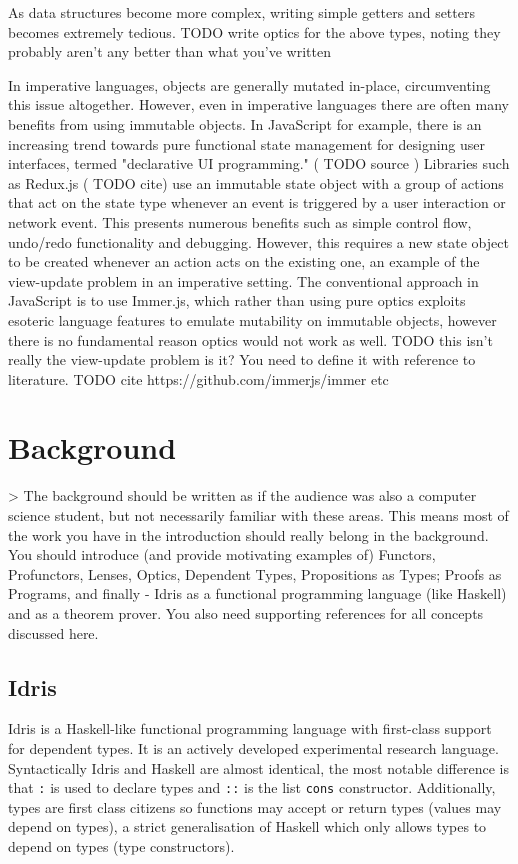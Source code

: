 \documentclass[]{report}
\begin{document}
As data structures become more complex, writing simple getters and setters becomes extremely tedious. TODO write optics for the above types, noting they probably aren't any better than what you've written

In imperative languages, objects are generally mutated in-place, circumventing this issue altogether. However, even in imperative languages there are often many benefits from using immutable objects. In JavaScript for example, there is an increasing trend towards pure functional state management for designing user interfaces, termed "declarative UI programming." ( TODO source ) Libraries such as Redux.js ( TODO cite) use an immutable state object with a group of actions that act on the state type whenever an event is triggered by a user interaction or network event. This presents numerous benefits such as simple control flow, undo/redo functionality and debugging. However, this requires a new state object to be created whenever an action acts on the existing one, an example of the view-update problem in an imperative setting. The conventional approach in JavaScript is to use Immer.js, which rather than using pure optics exploits esoteric language features to emulate mutability on immutable objects, however there is no fundamental reason optics would not work as well. TODO this isn't really the view-update problem is it? You need to define it with reference to literature. TODO cite https://github.com/immerjs/immer etc


\section{Background}

> The background should be written as if the audience was also a computer science student, but not necessarily familiar with these areas. This means most of the work you have in the introduction should really belong in the background. You should introduce (and provide motivating examples of) Functors, Profunctors, Lenses, Optics, Dependent Types, Propositions as Types; Proofs as Programs, and finally -  Idris as a functional programming language (like Haskell) and as a theorem prover. You also need supporting references for all concepts discussed here.


\subsection{Idris}

Idris is a Haskell-like functional programming language with first-class support for dependent types. It is an actively developed experimental research language. Syntactically Idris and Haskell are almost identical, the most notable difference is that \texttt{:} is used to declare types and \texttt{::} is the list \texttt{cons} constructor. Additionally, types are first class citizens so functions may accept or return types (values may depend on types), a strict generalisation of Haskell which only allows types to depend on types (type constructors).
\end{document}
